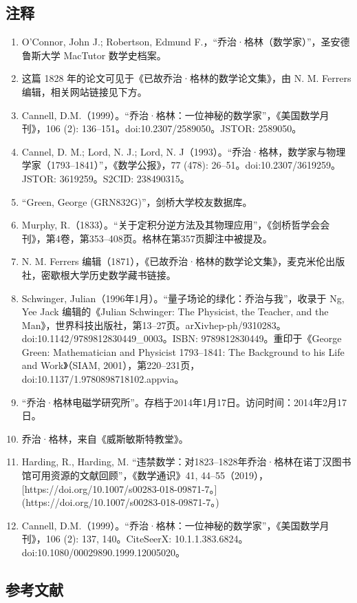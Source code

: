 \subsection{注释}
\begin{enumerate}
\item O'Connor, John J.; Robertson, Edmund F.，“乔治·格林（数学家）”，圣安德鲁斯大学 MacTutor 数学史档案。
\item 这篇 1828 年的论文可见于《已故乔治·格林的数学论文集》，由 N. M. Ferrers 编辑，相关网站链接见下方。
\item Cannell, D.M.（1999）。“乔治·格林：一位神秘的数学家”，《美国数学月刊》，106 (2): 136–151。doi:10.2307/2589050。JSTOR: 2589050。
\item Cannel, D. M.; Lord, N. J.; Lord, N. J（1993）。“乔治·格林，数学家与物理学家（1793–1841）”，《数学公报》，77 (478): 26–51。doi:10.2307/3619259。JSTOR: 3619259。S2CID: 238490315。
\item “Green, George (GRN832G)”，剑桥大学校友数据库。
\item Murphy, R.（1833）。“关于定积分逆方法及其物理应用”，《剑桥哲学会会刊》，第4卷，第353–408页。格林在第357页脚注中被提及。
\item N. M. Ferrers 编辑（1871），《已故乔治·格林的数学论文集》，麦克米伦出版社，密歇根大学历史数学藏书链接。
\item  Schwinger, Julian（1996年1月）。“量子场论的绿化：乔治与我”，收录于 Ng, Yee Jack 编辑的《Julian Schwinger: The Physicist, the Teacher, and the Man》，世界科技出版社，第13–27页。arXiv\:hep-ph/9310283。doi:10.1142/9789812830449\_0003。ISBN: 9789812830449。重印于《George Green: Mathematician and Physicist 1793–1841: The Background to his Life and Work》（SIAM, 2001），第220–231页，doi:10.1137/1.9780898718102.appvia。
\item “乔治·格林电磁学研究所”。存档于2014年1月17日。访问时间：2014年2月17日。
\item  乔治·格林，来自《威斯敏斯特教堂》。
\item Harding, R., Harding, M. “违禁数学：对1823–1828年乔治·格林在诺丁汉图书馆可用资源的文献回顾”，《数学通识》41, 44–55（2019），[https://doi.org/10.1007/s00283-018-09871-7。](https://doi.org/10.1007/s00283-018-09871-7。)
\item Cannell, D.M.（1999）。“乔治·格林：一位神秘的数学家”，《美国数学月刊》，106 (2): 137, 140。CiteSeerX: 10.1.1.383.6824。doi:10.1080/00029890.1999.12005020。
\end{enumerate}
\subsection{参考文献}

